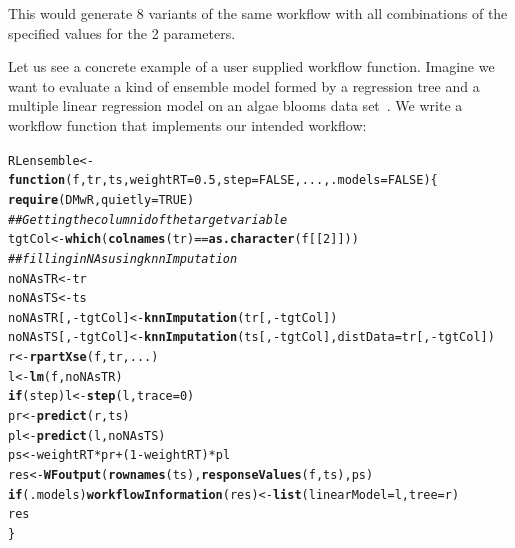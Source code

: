 \documentclass[10pt,a4paper]{article}\usepackage[]{graphicx}\usepackage[]{color}
\makeatletter
\newcommand{\hlnum}[1]{\textcolor[rgb]{0.686,0.059,0.569}{#1}}%
\newcommand{\hlcom}[1]{\textcolor[rgb]{0.678,0.584,0.686}{\textit{#1}}}%
\newcommand{\hlopt}[1]{\textcolor[rgb]{0,0,0}{#1}}%
\newcommand{\hlstd}[1]{\textcolor[rgb]{0.345,0.345,0.345}{#1}}%
\newcommand{\hlkwa}[1]{\textcolor[rgb]{0.161,0.373,0.58}{\textbf{#1}}}%
\newcommand{\hlkwb}[1]{\textcolor[rgb]{0.69,0.353,0.396}{#1}}%
\newcommand{\hlkwc}[1]{\textcolor[rgb]{0.333,0.667,0.333}{#1}}%
\newcommand{\hlkwd}[1]{\textcolor[rgb]{0.737,0.353,0.396}{\textbf{#1}}}%
\newenvironment{kframe}{%
 \def\at@end@of@kframe{}%
 \ifinner\ifhmode%
  \def\at@end@of@kframe{\end{minipage}}%
  \begin{minipage}{\columnwidth}%
 \fi\fi%
 \def\FrameCommand##1{\hskip\@totalleftmargin \hskip-\fboxsep
 \colorbox{shadecolor}{##1}\hskip-\fboxsep
     \hskip-\linewidth \hskip-\@totalleftmargin \hskip\columnwidth}%
 \MakeFramed {\advance\hsize-\width
   \@totalleftmargin\z@ \linewidth\hsize
   \@setminipage}}%
 {\par\unskip\endMakeFramed%
 \at@end@of@kframe}
\newenvironment{knitrout}{}{} %
\makeatother
\begin{document}
This would generate 8 variants of the same workflow with all
combinations of the specified values for the 2 parameters.  

Let us see a concrete example of a user supplied workflow
function. Imagine we want to evaluate a kind of ensemble model formed
by a regression tree and a multiple linear regression model on an
algae blooms data set~\cite{Tor10}.  We write a workflow function that implements our intended workflow:

\begin{knitrout}\footnotesize
{}\color{fgcolor}\begin{kframe}
\begin{alltt}
\hlstd{RLensemble} \hlkwb{<-} \hlkwa{function}\hlstd{(}\hlkwc{f}\hlstd{,} \hlkwc{tr}\hlstd{,} \hlkwc{ts}\hlstd{,} \hlkwc{weightRT}\hlstd{=}\hlnum{0.5}\hlstd{,} \hlkwc{step}\hlstd{=}\hlnum{FALSE}\hlstd{,} \hlkwc{...}\hlstd{,} \hlkwc{.models}\hlstd{=}\hlnum{FALSE}\hlstd{) \{}
  \hlkwd{require}\hlstd{(DMwR,}\hlkwc{quietly}\hlstd{=}\hlnum{TRUE}\hlstd{)}
  \hlcom{## Getting the column id of the target variable}
  \hlstd{tgtCol} \hlkwb{<-} \hlkwd{which}\hlstd{(}\hlkwd{colnames}\hlstd{(tr)} \hlopt{==} \hlkwd{as.character}\hlstd{(f[[}\hlnum{2}\hlstd{]]))}
  \hlcom{## filling in NAs using knnImputation}
  \hlstd{noNAsTR} \hlkwb{<-} \hlstd{tr}
  \hlstd{noNAsTS} \hlkwb{<-} \hlstd{ts}
  \hlstd{noNAsTR[,}\hlopt{-}\hlstd{tgtCol]} \hlkwb{<-} \hlkwd{knnImputation}\hlstd{(tr[,}\hlopt{-}\hlstd{tgtCol])}
  \hlstd{noNAsTS[,}\hlopt{-}\hlstd{tgtCol]} \hlkwb{<-} \hlkwd{knnImputation}\hlstd{(ts[,}\hlopt{-}\hlstd{tgtCol],}\hlkwc{distData}\hlstd{=tr[,}\hlopt{-}\hlstd{tgtCol])}
  \hlstd{r} \hlkwb{<-} \hlkwd{rpartXse}\hlstd{(f,tr,...)}
  \hlstd{l} \hlkwb{<-} \hlkwd{lm}\hlstd{(f,noNAsTR)}
  \hlkwa{if} \hlstd{(step) l} \hlkwb{<-} \hlkwd{step}\hlstd{(l,}\hlkwc{trace}\hlstd{=}\hlnum{0}\hlstd{)}
  \hlstd{pr} \hlkwb{<-} \hlkwd{predict}\hlstd{(r,ts)}
  \hlstd{pl} \hlkwb{<-} \hlkwd{predict}\hlstd{(l,noNAsTS)}
  \hlstd{ps} \hlkwb{<-} \hlstd{weightRT}\hlopt{*}\hlstd{pr}\hlopt{+}\hlstd{(}\hlnum{1}\hlopt{-}\hlstd{weightRT)}\hlopt{*}\hlstd{pl}
  \hlstd{res} \hlkwb{<-} \hlkwd{WFoutput}\hlstd{(}\hlkwd{rownames}\hlstd{(ts),}\hlkwd{responseValues}\hlstd{(f,ts),ps)}
  \hlkwa{if} \hlstd{(.models)} \hlkwd{workflowInformation}\hlstd{(res)} \hlkwb{<-} \hlkwd{list}\hlstd{(}\hlkwc{linearModel}\hlstd{=l,}\hlkwc{tree}\hlstd{=r)}
  \hlstd{res}
\hlstd{\}}
\end{alltt}
\end{kframe}
\end{knitrout}
\end{document}
